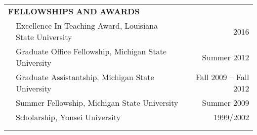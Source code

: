 \documentclass[10pt]{article}
\begin{document}
\begin{center}
\begin{tabular}{llllr}
\multicolumn{5}{l}{{\Large \textbf{F}}\textbf{ELLOWSHIPS} \textbf{AND}
{\Large \textbf{A}}\textbf{WARDS}} \vspace{0.1cm}\\
& \multicolumn{3}{l}{Excellence In Teaching Award, Louisiana State University}& \multicolumn{1}{r}{2016} \\
& \multicolumn{3}{l}{Graduate Office Fellowship, Michigan State University}& \multicolumn{1}{r}{Summer 2012} \\
& \multicolumn{3}{l}{Graduate Assistantship, Michigan State University} &
\multicolumn{1}{r}{Fall 2009 -- Fall 2012}\\
& \multicolumn{3}{l}{Summer Fellowship, Michigan State University}& \multicolumn{1}{r}{Summer 2009} \\
& \multicolumn{3}{l}{Scholarship, Yonsei University} &
\multicolumn{1}{r}{1999/2002}\\
\multicolumn{5}{l}{} \\\\

\end{tabular}
\end{center}
\end{document}
